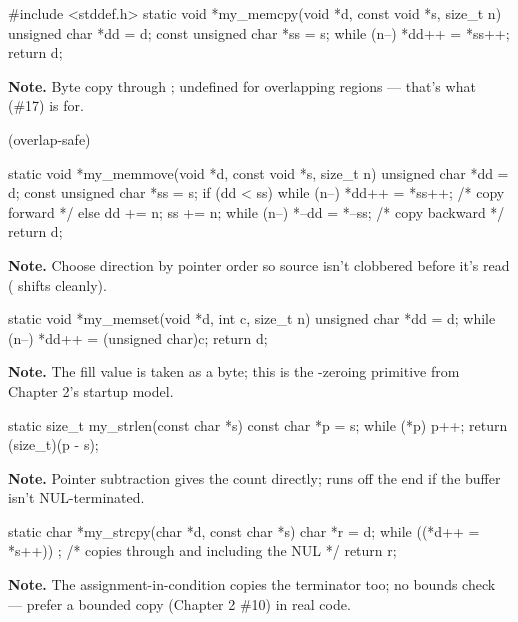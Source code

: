 \begin{gymproblem}{}
\begin{cgym}
#include <stddef.h>
static void *my_memcpy(void *d, const void *s, size_t n) {
    unsigned char *dd = d; const unsigned char *ss = s;
    while (n--) *dd++ = *ss++;
    return d;
}
\end{cgym}
\textbf{Note.} Byte copy through ; undefined for overlapping
regions --- that's what  (\#17) is for.
\end{gymproblem}

\begin{gymproblem}{ (overlap-safe)}
\begin{cgym}
static void *my_memmove(void *d, const void *s, size_t n) {
    unsigned char *dd = d; const unsigned char *ss = s;
    if (dd < ss) { while (n--) *dd++ = *ss++; }          /* copy forward */
    else { dd += n; ss += n; while (n--) *--dd = *--ss; } /* copy backward */
    return d;
}
\end{cgym}
\textbf{Note.} Choose direction by pointer order so source isn't clobbered before
it's read ( shifts cleanly).
\end{gymproblem}

\begin{gymproblem}{}
\begin{cgym}
static void *my_memset(void *d, int c, size_t n) {
    unsigned char *dd = d;
    while (n--) *dd++ = (unsigned char)c;
    return d;
}
\end{cgym}
\textbf{Note.} The fill value is taken as a byte; this is the -zeroing
primitive from Chapter 2's startup model.
\end{gymproblem}

\begin{gymproblem}{}
\begin{cgym}
static size_t my_strlen(const char *s) {
    const char *p = s;
    while (*p) p++;
    return (size_t)(p - s);
}
\end{cgym}
\textbf{Note.} Pointer subtraction gives the count directly; runs off the end if
the buffer isn't NUL-terminated.
\end{gymproblem}

\begin{gymproblem}{}
\begin{cgym}
static char *my_strcpy(char *d, const char *s) {
    char *r = d;
    while ((*d++ = *s++)) ;   /* copies through and including the NUL */
    return r;
}
\end{cgym}
\textbf{Note.} The assignment-in-condition copies the terminator too; no bounds
check --- prefer a bounded copy (Chapter 2 \#10) in real code.
\end{gymproblem}

